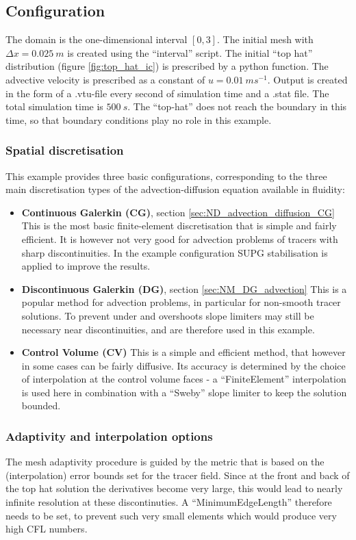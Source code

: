 \subsection{Configuration}
The domain is the one-dimensional interval $[0,3]$. The initial 
mesh with $\Delta x=0.025~m$ is created using the ``interval'' 
script. The initial ``top hat'' distribution (figure \ref{fig:top_hat_ic}) is 
prescribed by a python function. The advective velocity is 
prescribed as a constant of $u=0.01~ms^{-1}$. Output is created
in the form of a .vtu-file every second of simulation time
and a .stat file. The total simulation time is $500~s$. 
The ``top-hat'' does not reach the boundary in this time, so that
boundary conditions play no role in this example.

\subsubsection{Spatial discretisation}
This example provides three basic configurations, corresponding to
the three main discretisation types of the advection-diffusion equation
available in fluidity:
\begin{itemize}
\item {\bf Continuous Galerkin (CG)}, section \ref{sec:ND_advection_diffusion_CG}
This is the most basic finite-element discretisation that is simple 
and fairly efficient. It is however not very good for advection problems
of tracers with sharp discontinuities. In the example configuration
SUPG stabilisation is applied to improve the results.
\item {\bf Discontinuous Galerkin (DG)}, section \ref{sec:NM_DG_advection}
This is a popular method for advection problems, in particular 
for non-smooth tracer solutions. To prevent under and overshoots
slope limiters may still be necessary near discontinuities, and are
therefore used in this example.
\item {\bf Control Volume (CV)}
This is a simple and efficient method, that however in some cases 
can be fairly diffusive. Its accuracy is determined by the choice 
of interpolation at the control volume faces - a ``FiniteElement''
interpolation is used here in combination with a ``Sweby'' slope 
limiter to keep the solution bounded. 
\end{itemize}

\subsubsection{Adaptivity and interpolation options}
The mesh adaptivity procedure is guided by the metric that is based on
the (interpolation) error bounds set for the tracer field. Since at 
the front and back of the top hat solution the derivatives 
become very large, this would lead to nearly infinite resolution at these
discontinuties. A ``MinimumEdgeLength'' therefore needs to be set, to prevent
such very small elements which would produce very high CFL numbers.

